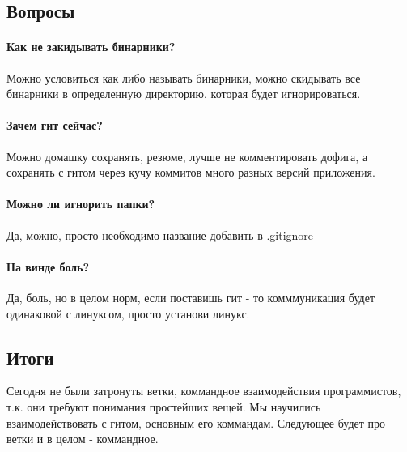 \documentclass[a4paper,12pt]{article}
\begin{document}
\subsection{Вопросы}
\paragraph{Как не закидывать бинарники?}
Можно условиться как либо называть бинарники, можно скидывать все бинарники в определенную директорию,
 которая будет игнорироваться. 
\paragraph{Зачем гит сейчас?}
Можно домашку сохранять, резюме, лучше не комментировать дофига, а сохранять с гитом через кучу коммитов много разных версий приложения. 
\paragraph{Можно ли игнорить папки?}
Да, можно, просто необходимо название добавить в .gitignore
\paragraph{На винде боль?}
Да, боль, но в целом норм, если поставишь гит - то комммуникация будет одинаковой с линуксом, просто 
установи линукс. 
\subsection{Итоги}
Сегодня не были затронуты ветки, коммандное взаимодействия программистов, т.к. они требуют понимания простейших вещей. Мы научились взаимодействовать с гитом, основным его коммандам. Следующее будет про ветки и в целом - коммандное.
\end{document}

